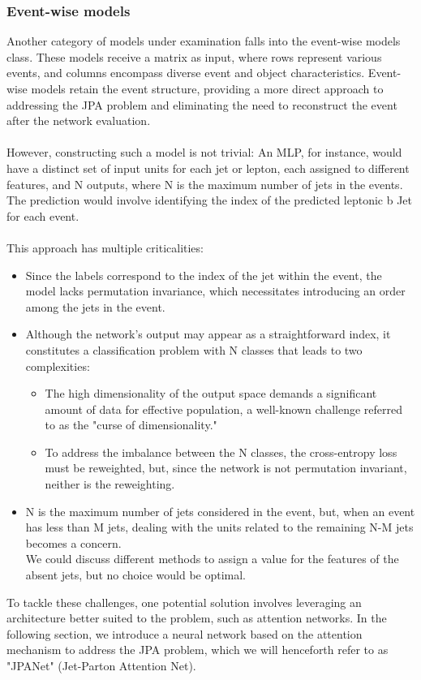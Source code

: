 \subsubsection*{Event-wise models}
Another category of models under examination falls into the event-wise models class. These models receive a matrix as input, where rows represent various events, and columns encompass diverse event and object characteristics. 
Event-wise models retain the event structure, providing a more direct approach to addressing the JPA problem and eliminating the need to reconstruct the event after the network evaluation.\\
\\
However, constructing such a model is not trivial: An MLP, for instance, would have a distinct set of input units for each jet or lepton, each assigned to different features, and N outputs, where N is the maximum number of jets in the events. The prediction would involve identifying the index of the predicted leptonic b Jet for each event.\\
\\
This approach has multiple criticalities:
\begin{itemize}
    \item Since the labels correspond to the index of the jet within the event, the model lacks permutation invariance, which necessitates introducing an order among the jets in the event.
    \item Although the network's output may appear as a straightforward index,  it constitutes a classification problem with N classes that leads to two complexities:
    \begin{itemize}
        \item[\ding{111}] The high dimensionality of the output space demands a significant amount of data for effective population, a well-known challenge referred to as the "curse of dimensionality."
        \item[\ding{111}] To address the imbalance between the N classes, the cross-entropy loss must be reweighted, but, since the network is not permutation invariant, neither is the reweighting.
    \end{itemize}
    \item N is the maximum number of jets considered in the event, but, when an event has less than M jets, dealing with the units related to the remaining N-M jets becomes a concern.\\
    We could discuss different methods to assign a value for the features of the absent jets, but no choice would be optimal.
\end{itemize}
To tackle these challenges, one potential solution involves leveraging an architecture better suited to the problem, such as attention networks. In the following section, we introduce a neural network based on the attention mechanism to address the JPA problem, which we will henceforth refer to as "JPANet" (Jet-Parton Attention Net).

